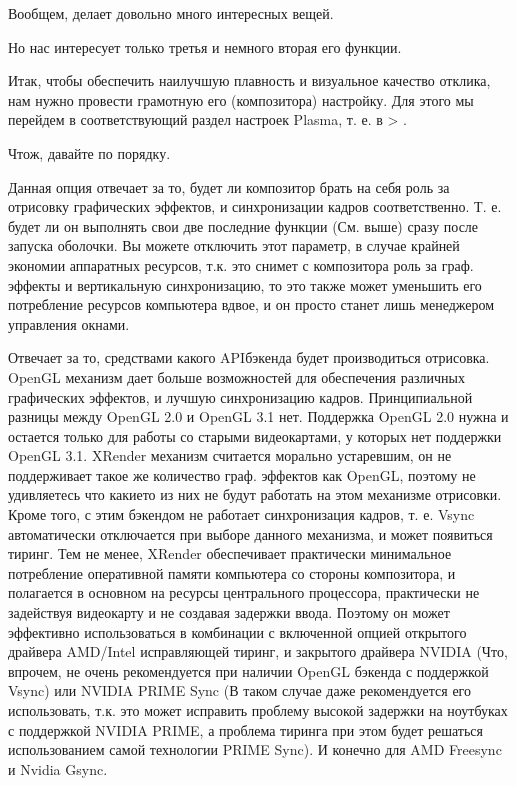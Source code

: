 \documentclass[letterpaper,10pt,russian,openany]{sphinxmanual}
\begin{document}
\sphinxAtStartPar
Вообщем, делает довольно много интересных вещей.

\sphinxAtStartPar
Но нас интересует только третья и немного вторая его функции.

\sphinxAtStartPar
Итак, чтобы обеспечить наилучшую плавность и визуальное качество отклика, нам нужно провести грамотную его (композитора) настройку.
Для этого мы перейдем в соответствующий раздел настроек Plasma, т. е. в  \sphinxhyphen{}> .

\noindent{}

\sphinxAtStartPar
Что\sphinxhyphen{}ж, давайте по порядку.

\sphinxAtStartPar
{}

\sphinxAtStartPar
Данная опция отвечает за то, будет ли композитор брать на себя роль за отрисовку графических эффектов, и синхронизации кадров соответственно.
Т. е. будет ли он выполнять свои две последние функции (См. выше) сразу после запуска оболочки.
Вы можете отключить этот параметр, в случае крайней экономии аппаратных ресурсов,
т.к. это снимет с композитора роль за граф. эффекты и вертикальную синхронизацию,
то это также может уменьшить его потребление ресурсов компьютера вдвое,
и он просто станет лишь менеджером управления окнами.

\sphinxAtStartPar
{}

\sphinxAtStartPar
Отвечает за то, средствами какого API\sphinxhyphen{}бэкенда будет производиться отрисовка.
OpenGL механизм дает больше возможностей для обеспечения различных графических эффектов, и лучшую синхронизацию кадров.
Принципиальной разницы между OpenGL 2.0 и OpenGL 3.1 \sphinxhyphen{} нет.
Поддержка OpenGL 2.0 нужна и остается только для работы со старыми видеокартами, у которых нет поддержки OpenGL 3.1.
XRender механизм считается морально устаревшим, он не поддерживает такое же количество граф. эффектов как OpenGL,
поэтому не удивляетесь что какие\sphinxhyphen{}то из них не будут работать на этом механизме отрисовки.
Кроме того, с этим бэкендом не работает синхронизация кадров, т. е. Vsync автоматически отключается при выборе данного механизма, и может появиться тиринг.
Тем не менее, XRender обеспечивает практически минимальное потребление оперативной памяти компьютера со стороны композитора,
и полагается в основном на ресурсы центрального процессора, практически не задействуя видеокарту и не создавая задержки ввода.
Поэтому он может эффективно использоваться в комбинации с включенной  опцией открытого драйвера AMD/Intel исправляющей тиринг,
и   закрытого драйвера NVIDIA
(Что, впрочем, не очень рекомендуется при наличии OpenGL бэкенда с поддержкой Vsync) или NVIDIA PRIME Sync
(В таком случае даже рекомендуется его использовать, т.к. это может исправить проблему высокой задержки на ноутбуках с поддержкой NVIDIA PRIME,
а проблема тиринга при этом будет решаться использованием самой технологии PRIME Sync).
И конечно для AMD Freesync и Nvidia Gsync.
\end{document}
